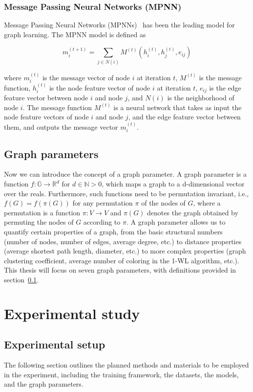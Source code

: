 \documentclass{article}
\begin{document}
\subsubsection{Message Passing Neural Networks (MPNN)}
Message Passing Neural Networks (MPNNs)~\cite{gilmer2017neural} has been the leading model for graph learning. The MPNN model is defined as 

$$
    m_i^{(t+1)} = \sum_{j\in N(i)}M^{(t)}(h_i^{(t)}, h_j^{(t)}, e_{ij})
$$

where $m_i^{(t)}$ is the message vector of node $i$ at iteration $t$, $M^{(t)}$ is the message function, $h_i^{(t)}$ is the node feature vector of node $i$ at iteration $t$, $e_{ij}$ is the edge feature vector between node $i$ and node $j$, and $N(i)$ is the neighborhood of node $i$. The message function $M^{(t)}$ is a neural network that takes as input the node feature vectors of node $i$ and node $j$, and the edge feature vector between them, and outputs the message vector $m_i^{(t)}$.

\subsection{Graph parameters} \label{sec:graph_parameters}
Now we can introduce the concept of a graph parameter. A graph parameter is a function $f: \mathbb{G} \rightarrow \mathbb{R}^d$ for $d\in \mathbb{N} >0$, which maps a graph to a d-dimensional vector over the reals. Furthermore, such functions need to be permutation invariant, i.e., $f(G) = f(\pi(G))$ for any permutation $\pi$ of the nodes of $G$, where a permutation is a function $\pi: V \rightarrow V$ and $\pi(G)$ denotes the graph obtained by permuting the nodes of $G$ according to $\pi$. A graph parameter allows us to quantify certain properties of a graph, from the basic structural numbers (number of nodes, number of edges, average degree, etc.) to distance properties (average shortest path length, diameter, etc.) to more complex properties (graph clustering coefficient, average number of coloring in the 1-WL algorithm, etc.). This thesis will focus on seven graph parameters, with definitions provided in section~\ref{sec:graph_parameters}.

\section{Experimental study}

\subsection{Experimental setup}
The following section outlines the planned methods and materials to be employed in the experiment, including the training framework, the datasets, the models, and the graph parameters.
\end{document}

